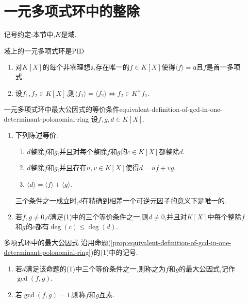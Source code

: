 \section{一元多项式环中的整除}

记号约定:本节中,$K$是域.

\begin{proposition}{域上的一元多项式环是PID}{}
	\begin{enumerate}
		\item 对$K\left[X\right]$的每个非零理想$\mathfrak{a}$,存在唯一的$f\in K\left[X\right]$使得$\langle f\rangle=\mathfrak{a}$且$f$是首一多项式.
		\item 设$f_{1},f_{2}\in K\left[X\right]$,则$\langle f_{1}\rangle=\langle f_{2}\rangle\iff f_{2}\in K^{\times}f_{1}$.
	\end{enumerate}
\end{proposition}

\begin{proposition}{一元多项式环中最大公因式的等价条件}{equivalent-definition-of-gcd-in-one-determinant-polonomial-ring}
	设$f,g,d\in K\left[X\right]$.
	\begin{enumerate}
		\item 下列陈述等价:
		\begin{enumerate}
			\item $d$整除$f$和$g$,并且对每个整除$f$和$g$的$c\in K\left[X\right]$都整除$d$.
			\item $d$整除$f$和$g$,并且存在$u,v\in K\left[X\right]$使得$d=uf+vg$.
			\item $\langle d\rangle=\langle f\rangle+\langle g\rangle$.
		\end{enumerate}
		三个条件之一成立时,$d$在精确到相差一个可逆元因子的意义下是唯一的.
		\item 若$f,g\neq 0$,$d$满足(1)中的三个等价条件之一,则$d\neq 0$,并且对$K\left[X\right]$中每个整除$f$和$g$的$c$都有$\deg\left(c\right)\leq\deg\left(d\right)$.
	\end{enumerate}
\end{proposition}

\begin{definition}{多项式环中的最大公因式}{}
	沿用命题(\cref{prop:equivalent-definition-of-gcd-in-one-determinant-polonomial-ring})的(1)中的记号.
	\begin{enumerate}
		\item 若$d$满足该命题的(1)中三个等价条件之一,则称之为$f$和$g$的最大公因式,记作$\gcd\left(f,g\right)$.
		\item 若$\gcd\left(f,g\right)=1$,则称$f$和$g$互素.
	\end{enumerate}
\end{definition}

